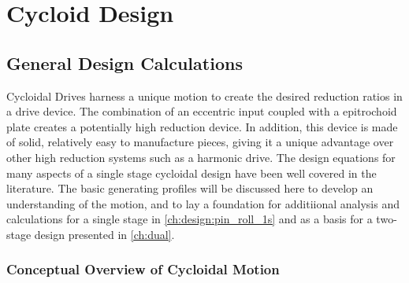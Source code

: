 
\chapter{Cycloid Design}\label{ch:design_1s}


\section{General Design Calculations} \label{ch:design:basic_calc}

Cycloidal Drives harness a unique motion to create the desired reduction ratios in a drive device. The combination of an eccentric input coupled with a epitrochoid plate creates a potentially high reduction device. In addition, this device is made of solid, relatively easy to manufacture pieces, giving it a unique advantage over other high reduction systems such as a harmonic drive. The design equations for many aspects of a single stage cycloidal design have been well covered in the literature. The basic generating profiles will be discussed here to develop an understanding of the motion, and to lay a foundation for additiional analysis and calculations for a single stage in \ref{ch:design:pin_roll_1s} and as a basis for a two-stage design presented in \ref{ch:dual}. 

\subsection{Conceptual Overview of Cycloidal Motion} \label{ch:design:basic_calc:overview}

